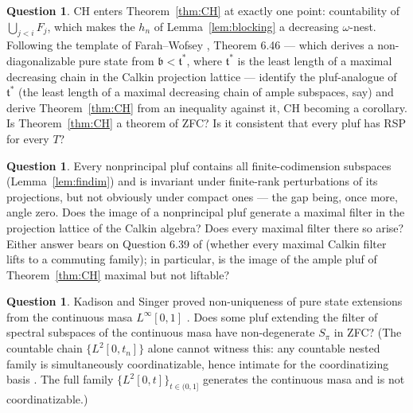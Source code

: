 \documentclass[11pt,reqno]{amsart}
\theoremstyle{definition}
\newtheorem{question}[theorem]{Question}
\newcommand{\pluf}{\pi}
\begin{document}
\begin{question}\label{q:tstar}
CH enters Theorem~\ref{thm:CH} at exactly one point: countability of
$\bigcup_{j<i}F_j$, which makes the $h_n$ of Lemma~\ref{lem:blocking} a decreasing
$\omega$-nest. Following the template of Farah--Wofsey \cite{FarahWofsey}, Theorem 6.46
--- which derives a non-diagonalizable pure state from $\mathfrak b<\mathfrak t^*$, where
$\mathfrak t^*$ is the least length of a maximal decreasing chain in the Calkin
projection lattice --- identify the pluf-analogue of $\mathfrak t^*$ (the least length of
a maximal decreasing chain of ample subspaces, say) and derive Theorem~\ref{thm:CH} from
an inequality against it, CH becoming a corollary. Is Theorem~\ref{thm:CH} a theorem of
ZFC? Is it consistent that every pluf has RSP for every $T$?
\end{question}

\begin{question}\label{q:calkin}
Every nonprincipal pluf contains all finite-codimension subspaces
(Lemma~\ref{lem:findim}) and is invariant under finite-rank perturbations of its
projections, but not obviously under compact ones --- the gap being, once more, angle
zero. Does the image of a nonprincipal pluf generate a maximal filter in the projection
lattice of the Calkin algebra? Does every maximal filter there so arise? Either answer
bears on Question 6.39 of \cite{FarahWofsey} (whether every maximal Calkin filter lifts
to a commuting family); in particular, is the image of the ample pluf of
Theorem~\ref{thm:CH} maximal but not liftable?
\end{question}

\begin{question}\label{q:continuous}
Kadison and Singer proved non-uniqueness of pure state extensions from the continuous
masa $L^\infty[0,1]$ \cite{KadisonSinger}. Does some pluf extending the filter of
spectral subspaces of the continuous masa have non-degenerate $S_\pluf$ in ZFC? (The
countable chain $\{L^2[0,t_n]\}$ alone cannot witness this: any countable nested family
is simultaneously coordinatizable, hence intimate for the coordinatizing basis
\cite{FWII}. The full family $\{L^2[0,t]\}_{t\in(0,1]}$ generates the continuous masa
and is not coordinatizable.)
\end{question}
\end{document}
